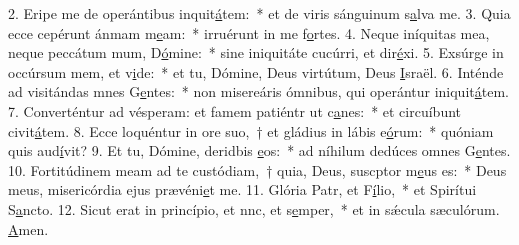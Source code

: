2. Eripe me de operántibus inquit\uline{á}tem:~* et de viris sánguinum s\uline{a}lva me.
3. Quia ecce cepérunt ánmam m\uline{e}am:~* irruérunt in me f\uline{o}rtes.
4. Neque iníquitas mea, neque peccátum mum, D\uline{ó}mine:~* sine iniquitáte cucúrri, et dir\uline{é}xi.
5. Exsúrge in occúrsum mem, et v\uline{i}de:~* et tu, Dómine, Deus virtútum, Deus \uline{I}sraël.
6. Inténde ad visitándas mnes G\uline{e}ntes:~* non misereáris ómnibus, qui operántur iniquit\uline{á}tem.
7. Converténtur ad vésperam: et famem patiéntr ut c\uline{a}nes:~* et circuíbunt civit\uline{á}tem.
8. Ecce loquéntur in ore suo,~† et gládius in lábis e\uline{ó}rum:~* quóniam quis aud\uline{í}vit?
9. Et tu, Dómine, deridbis \uline{e}os:~* ad níhilum dedúces omnes G\uline{e}ntes.
10. Fortitúdinem meam ad te custódiam,~† quia, Deus, suscptor m\uline{e}us es:~* Deus meus, misericórdia ejus prævéni\uline{e}t me.
11. Glória Patr, et F\uline{í}lio,~* et Spirítui S\uline{a}ncto.
12. Sicut erat in princípio, et nnc, et s\uline{e}mper,~* et in sǽcula sæculórum. \uline{A}men.
